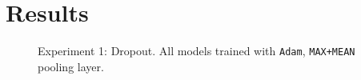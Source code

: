 \documentclass[12pt]{article}
\newcounter{ct}
\begin{document}
\section*{Results}
\begin{figure}[H]%
    \centering
    \qquad
    \caption{
        Experiment 1: Dropout. All models trained with 
        {\tt Adam}, {\tt MAX+MEAN} pooling layer.            
        }       
    \label{fig:example}%
    \centering
\end{figure}
\end{document}
